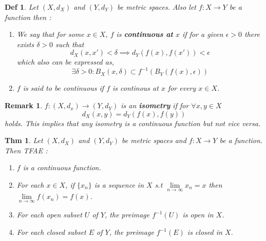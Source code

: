 \documentclass[paper=a4, fontsize=11pt]{scrartcl}
\newtheorem{theorem}{Thm}
\newtheorem{definition}{Def}
\newtheorem*{remark}{Remark}
\begin{document}
\begin{definition}
	Let $(X,d_X)$ and $(Y,d_Y)$ be metric spaces. Also let $f:X \to Y$ be a function then :
	\begin{enumerate}[label=\arabic*)]
		\item We say that for some $x\in X$, $f$ is \textbf{continuous at} $x$ if for a given $\epsilon > 0 $ there exists $\delta>0$ such that 
		\begin{equation}\nonumber
			d_X(x,x') < \delta \implies d_Y(f(x),f(x')) < \epsilon
		\end{equation}
		which also can be expressed as, 
		\begin{equation}\nonumber
			\exists \delta>0 : B_X(x,\delta) \subset f^{-1}(B_Y(f(x),\epsilon))
		\end{equation}
		\item $f$ is said to be continuous if $f$ is continous at $x$ for every $x \in X$.
	\end{enumerate}
\end{definition}

\vspace{0.15in}

\begin{remark}
	$f:(X,d_x) \to (Y,d_Y)$ is an \textbf{isometry} if for $\forall x,y \in X$ 
	\begin{equation}\nonumber
		d_X(x,y) = d_Y(f(x),f(y))
	\end{equation}
	holds. This implies that any isometry is a continuous function but not vice versa.
\end{remark}

\vspace{0.15in}

\begin{theorem}
Let $(X,d_X)$ and $(Y,d_Y)$ be metric spaces and $f:X \to Y$ be a function. Then TFAE :
\begin{enumerate}[label=\arabic*)]
	\item $f$ is a continuous function.
	\item For each $x\in X$, if $\{x_n\}$ is a sequence in $X$ s.t $\lim\limits_{n\to \infty} x_n =x $ then $\lim\limits_{n \to \infty}f(x_n)=f(x)$.
	\item For each open subset $U$ of $Y$, the preimage $f^{-1}(U)$ is open in $X$.
	\item For each closed subset $E$ of $Y$, the preimage $f^{-1}(E)$ is closed in $X$.\\
\end{enumerate}
\end{theorem}
\end{document}
